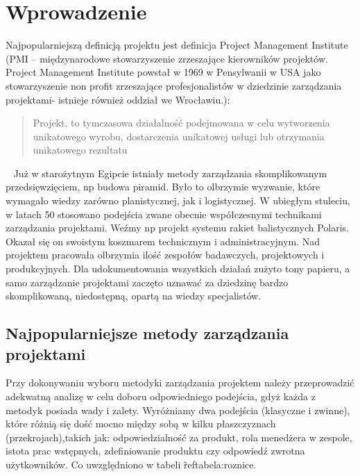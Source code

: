 
\chapter{Wprowadzenie}

Najpopularniejszą definicją projektu jest definicja Project Management Institute (PMI – międzynarodowe stowarzyszenie zrzeszające kierowników projektów.
Project Management Institute powstał w 1969 w Pensylwanii w USA jako stowarzyszenie non profit zrzeszające profesjonalistów
w dziedzinie zarządzania projektami- istnieje również oddział we Wrocławiu.): 
\begin{quote}
Projekt, to tymczasowa działalność podejmowana w celu wytworzenia unikatowego wyrobu,
dostarczenia unikatowej usługi lub otrzymania unikatowego rezultatu
\end{quote}
~\cite{PMI_2000}
Już w starożytnym Egipcie istniały metody zarządzania skomplikowanym przedsięwzięciem,
np budowa piramid. Było to olbrzymie wyzwanie, które wymagało wiedzy zarówno planistycznej,
jak i logistycznej. W ubiegłym stuleciu, w latach 50 stosowano podejścia zwane obecnie współczesnymi
technikami zarządzania projektami. Weźmy np projekt systemu rakiet balistycznych Polaris.
Okazał się on swoistym koszmarem technicznym i administracyjnym. Nad projektem pracowała olbrzymia ilość zespołów badawczych,
projektowych i produkcyjnych. Dla udokumentowania wszystkich działań zużyto tony papieru, a samo zarządzanie projektami zaczęto
uznawać za dziedzinę bardzo skomplikowaną, niedostępną, opartą na wiedzy specjalistów.\cite{Stanley_2013}

\section{Najpopularniejsze metody zarządzania projektami}
Przy dokonywaniu wyboru metodyki zarządzania projektem należy przeprowadzić adekwatną analizę w celu doboru odpowiedniego podejścia,
gdyż każda z metodyk posiada wady i zalety. Wyróżniamy dwa podejścia (klasyczne i zwinne), które różnią się dość mocno między sobą w kilku płaszczyznach (przekrojach),takich jak:
odpowiedzialność za produkt, rola menedżera w zespole, istota prac wstępnych, zdefiniowanie produktu czy odpowiedź zwrotna użytkowników.
Co uwzględniono w tabeli \~ref{tabela:roznice}.

